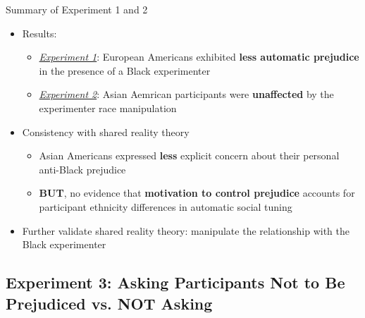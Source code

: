     \begin{frame}{Summary of Experiment 1 and 2}
    \begin{itemize}
        \item<+-> Results:
        \begin{itemize}
            \item \textit{\underline{Experiment 1}}: European Americans exhibited \textcolor{lightlavender!55!white}{\textbf{less automatic prejudice}} in the presence of a Black experimenter 
            \item \textit{\underline{Experiment 2}}: Asian Aemrican participants were \textcolor{lightlavender!55!white}{\textbf{unaffected}} by the experimenter race manipulation
        \end{itemize} 
        \item<+-> Consistency with shared reality theory
        \begin{itemize}
            \item Asian Americans expressed \textcolor{lightlavender!55!white}{\textbf{less}} explicit concern about their personal anti-Black prejudice
            \item \textbf{BUT}, no evidence that \textcolor{lightlavender!55!white}{\textbf{motivation to control prejudice}} accounts for participant ethnicity differences in automatic social tuning 
        \end{itemize}
        \item<+-> Further validate shared reality theory: manipulate the relationship with the Black experimenter
    \end{itemize}
    \end{frame}

    \subsection{Experiment 3: Asking Participants Not to Be Prejudiced vs. NOT Asking}
    
